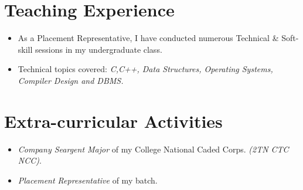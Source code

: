 \documentclass{resume}
\begin{document}
\section{Teaching Experience}
  \begin{itemize}[label={$\ast$}]
    \item As a Placement Representative, I have conducted numerous Technical \& Soft-skill sessions in my undergraduate class.
    \item Technical topics covered: \textit{C,C++, Data Structures, Operating Systems, Compiler Design and DBMS.}
  \end{itemize}

\section{Extra-curricular Activities}
  \begin{itemize}[label={$\ast$}]
    \item \textit{Company Seargent Major} of my College National Caded Corps. \textit{(2TN CTC NCC)}.
    \item \textit{Placement Representative} of my batch.
  \end{itemize}
  
\end{document}

